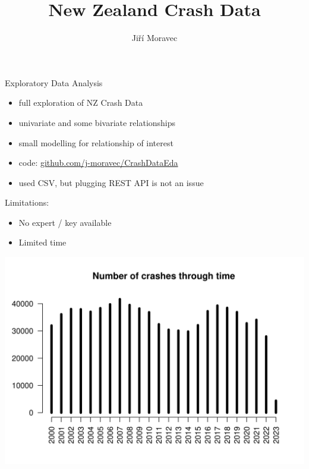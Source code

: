 \documentclass[xcolor=dvipsnames,xcolor=table, 14p]{beamer}
\author[J. M.]{Jiří Moravec}
\title[NZCD]{New Zealand Crash Data}
\date{}
\begin{document}
\begin{frame}
\maketitle
\end{frame}

\begin{frame}
Exploratory Data Analysis
\begin{itemize}
    \item full exploration of NZ Crash Data
    \item univariate and some bivariate relationships
    \item small modelling for relationship of interest
    \item code: \url{github.com/j-moravec/CrashDataEda}
    \item used CSV, but plugging REST API is not an issue
\end{itemize}

Limitations:
\begin{itemize}
    \item No expert / key available
    \item Limited time
\end{itemize}
\end{frame}

\begin{frame}
    \centering
    \includegraphics[width=1\textwidth]{figures/time-1.png}
\end{frame}
\end{document}
